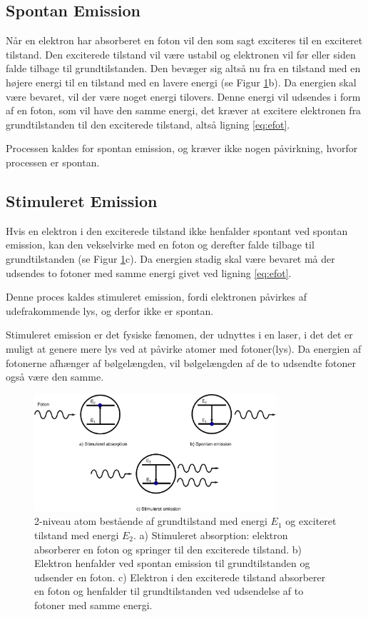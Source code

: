 \subsection{Spontan Emission}
Når en elektron har absorberet en foton vil den som sagt exciteres til en exciteret tilstand. Den exciterede tilstand vil være ustabil og elektronen vil før eller siden falde tilbage til grundtilstanden. Den bevæger sig altså nu fra en tilstand med en højere energi til en tilstand med en lavere energi (se Figur \ref{fig:vekselvirkning}b). Da energien skal være bevaret, vil der være noget energi tilovers. Denne energi vil udsendes i form af en foton, som vil have den samme energi, det kræver at excitere elektronen fra grundtilstanden til den exciterede tilstand, altså ligning \ref{eq:efot}. 

Processen kaldes for spontan emission, og kræver ikke nogen påvirkning, hvorfor processen er spontan. 

\subsection{Stimuleret Emission}
Hvis en elektron i den exciterede tilstand ikke henfalder spontant ved spontan emission, kan den vekselvirke med en foton og derefter falde tilbage til grundtilstanden (se Figur \ref{fig:vekselvirkning}c). Da energien stadig skal være bevaret må der udsendes to fotoner med samme energi givet ved ligning \ref{eq:efot}. 

Denne proces kaldes stimuleret emission, fordi elektronen påvirkes af udefrakommende lys, og derfor ikke er spontan. 

Stimuleret emission er det fysiske fænomen, der udnyttes i en laser, i det det er muligt at genere mere lys ved at påvirke atomer med fotoner(lys). Da energien af fotonerne afhænger af bølgelængden, vil bølgelængden af de to udsendte fotoner også være den samme. 

\begin{figure}[h!]
  \centering
  \includegraphics[width=0.8\textwidth]{Laserfysik/vekselvirkning2.png}
  \caption{2-niveau atom bestående af grundtilstand med energi $E_1$ og exciteret tilstand med energi $E_2$. a) Stimuleret absorption: elektron absorberer en foton og springer til den exciterede tilstand. b) Elektron henfalder ved spontan emission til grundtilstanden og udsender en foton. c) Elektron i den exciterede tilstand absorberer en foton og henfalder til grundtilstanden ved udsendelse af to fotoner med samme energi. }
  \label{fig:vekselvirkning}
\end{figure}

